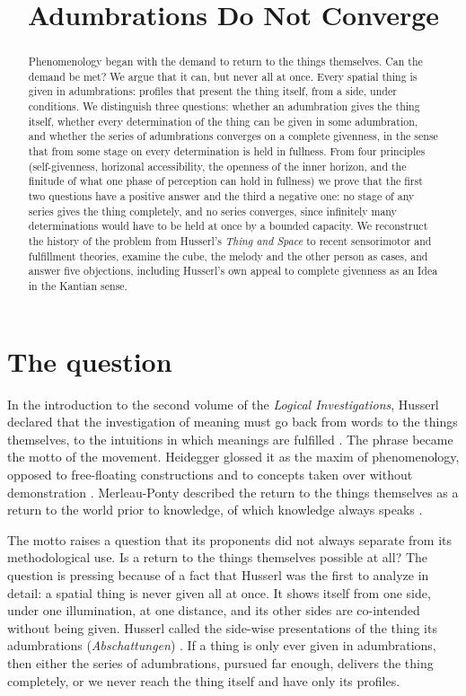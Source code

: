 \documentclass{situationist-preprint}
\title{Adumbrations Do Not Converge}
\begin{document}
\maketitle

\begin{abstract}
Phenomenology began with the demand to return to the things themselves. Can the demand be met? We argue that it can, but never all at once. Every spatial thing is given in adumbrations: profiles that present the thing itself, from a side, under conditions. We distinguish three questions: whether an adumbration gives the thing itself, whether every determination of the thing can be given in some adumbration, and whether the series of adumbrations converges on a complete givenness, in the sense that from some stage on every determination is held in fullness. From four principles (self-givenness, horizonal accessibility, the openness of the inner horizon, and the finitude of what one phase of perception can hold in fullness) we prove that the first two questions have a positive answer and the third a negative one: no stage of any series gives the thing completely, and no series converges, since infinitely many determinations would have to be held at once by a bounded capacity. We reconstruct the history of the problem from Husserl's \emph{Thing and Space} to recent sensorimotor and fulfillment theories, examine the cube, the melody and the other person as cases, and answer five objections, including Husserl's own appeal to complete givenness as an Idea in the Kantian sense.
\end{abstract}

\section{The question}

In the introduction to the second volume of the \emph{Logical Investigations}, Husserl declared that the investigation of meaning must go back from words to the things themselves, to the intuitions in which meanings are fulfilled \citep[vol.~2, Introduction, §2]{Husserl1901}. The phrase became the motto of the movement. Heidegger glossed it as the maxim of phenomenology, opposed to free-floating constructions and to concepts taken over without demonstration \citep[§7]{Heidegger1927}. Merleau-Ponty described the return to the things themselves as a return to the world prior to knowledge, of which knowledge always speaks \citep[Preface]{MerleauPonty1945}.

The motto raises a question that its proponents did not always separate from its methodological use. Is a return to the things themselves possible at all? The question is pressing because of a fact that Husserl was the first to analyze in detail: a spatial thing is never given all at once. It shows itself from one side, under one illumination, at one distance, and its other sides are co-intended without being given. Husserl called the side-wise presentations of the thing its adumbrations (\emph{Abschattungen}) \citep[§§41--44]{Husserl1913}. If a thing is only ever given in adumbrations, then either the series of adumbrations, pursued far enough, delivers the thing completely, or we never reach the thing itself and have only its profiles.
\end{document}
